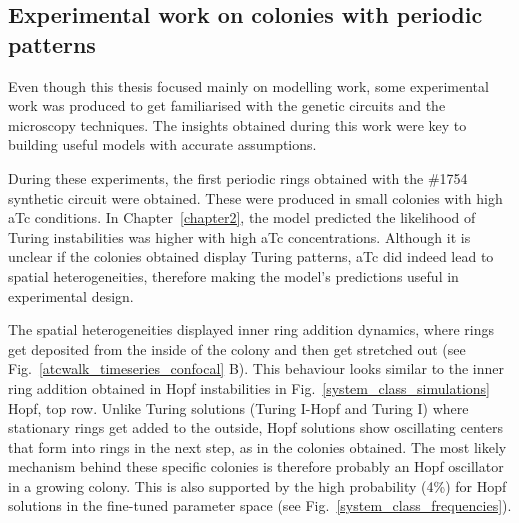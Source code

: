 \subsection{Experimental work on colonies with periodic patterns}
Even though this thesis focused mainly on modelling work, some experimental work was produced to get familiarised with the genetic circuits and the microscopy techniques.
The insights obtained during this work were key to building useful models with accurate assumptions.

During these experiments, the first periodic rings obtained with the \#1754 synthetic circuit were obtained.
These were produced in small colonies with high aTc conditions.
In Chapter~\ref{chapter2}, the model predicted the likelihood of Turing instabilities was higher with high aTc concentrations.
Although it is unclear if the colonies obtained display Turing patterns, aTc did indeed lead to spatial heterogeneities, therefore making the model's predictions useful in experimental design.

The spatial heterogeneities displayed inner ring addition dynamics, where rings get deposited from the inside of the colony and then get stretched out (see Fig.~\ref{atcwalk_timeseries_confocal} B).
This behaviour looks similar to the inner ring addition obtained in Hopf instabilities in Fig.~\ref{system_class_simulations} Hopf, top row.
Unlike Turing solutions (Turing I-Hopf and Turing I) where stationary rings get added to the outside, Hopf solutions show oscillating centers that form into rings in the next step, as in the colonies obtained.
The most likely mechanism behind these specific colonies is therefore probably an Hopf oscillator in a growing colony.
This is also supported by the high probability (4\%) for Hopf solutions in the fine-tuned parameter space (see Fig.~\ref{system_class_frequencies}).

